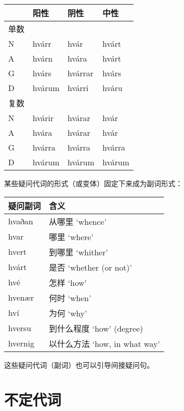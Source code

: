 \begin{longtable}{llll}
    \toprule
         & 阳性   & 阴性    & 中性   \\
    \midrule
    \endhead
    \bottomrule
    \endfoot
    单数 &        &         &        \\
    N    & hvárr  & hvár    & hvárt  \\
    A    & hvárn  & hvára   & hvárt  \\
    G    & hvárs  & hvárrar & hvárs  \\
    D    & hvárum & hvárri  & hváru  \\
    复数 &        &         &        \\
    N    & hvárir & hvárar  & hvár   \\
    A    & hvára  & hvárar  & hvár   \\
    G    & hvárra & hvárra  & hvárra \\
    D    & hvárum & hvárum  & hvárum \\
\end{longtable}

某些疑问代词的形式（或变体）固定下来成为副词形式：

\begin{longtable}{ll}
    \toprule
    疑问副词 & 含义                          \\
    \midrule
    \endhead
    \bottomrule
    \endfoot
    hvaðan   & 从哪里 `whence‌'               \\
    hvar     & 哪里 `where‌'                  \\
    hvert    & 到哪里 `whither‌'              \\
    hvárt    & 是否 `whether (or not)‌'       \\
    hvé      & 怎样 `how‌'                    \\
    hvenær   & 何时 `when‌'                   \\
    hví      & 为何 `why‌'                    \\
    hversu   & 到什么程度 `how‌' (degree)     \\
    hvernig  & 以什么方法 `how, in what way‌' \\
\end{longtable}

这些疑问代词（副词）也可以引导间接疑问句。

\section{不定代词}\label{不定代词}

